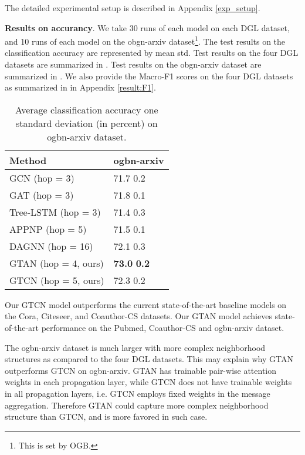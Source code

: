 \documentclass[lettersize,journal]{IEEEtran}
\theoremstyle{plain}
\theoremstyle{definition}
\theoremstyle{remark}
\begin{document}
The detailed experimental setup is described in Appendix \ref{exp_setup}.

\textbf{Results on accurancy}. We take 30 runs of each model on each DGL dataset, and 10 runs of each model on the obgn-arxiv dataset\footnote{This is set by OGB.}. The test results on the classification accuracy are represented by mean  std. Test results on the four DGL datasets are summarized in . Test results on the obgn-arxiv dataset are summarized in . We also provide the Macro-F1 scores on the four DGL datasets as summarized in  in Appendix \ref{result:F1}.

\begin{table}[ht]
	\caption{Average classification accuracy  one standard deviation (in percent) on ogbn-arxiv dataset.}
	\label{tb:result_ogb}
	\begin{center}
			\begin{tabular}{ll}
				\toprule
				\textbf{Method} &\textbf{ogbn-arxiv}\\
				\midrule
				GCN (hop = 3)  &71.7  0.2 \\
				GAT (hop = 3) &71.8  0.1 \\
				Tree-LSTM (hop = 3) &71.4  0.3 \\
				APPNP (hop = 5) &71.5  0.1 \\
				DAGNN (hop = 16) &72.1  0.3 \\
				\midrule
				GTAN (hop = 4, ours) &\textbf{73.0}  \textbf{0.2}\\
				GTCN (hop = 5, ours) &72.3  0.2\\
				\bottomrule
			\end{tabular}
	\end{center}
\end{table}

Our GTCN model outperforms the current state-of-the-art baseline models on the Cora, Citeseer, and Coauthor-CS datasets. Our GTAN model achieves state-of-the-art performance on the Pubmed, Coauthor-CS and ogbn-arxiv dataset.

The ogbn-arxiv dataset is much larger with more complex neighborhood structures as compared to the four DGL datasets. This may explain why GTAN outperforms GTCN on ogbn-arxiv. GTAN has trainable pair-wise attention weights in each propagation layer, while GTCN does not have trainable weights in all propagation layers, i.e. GTCN employs fixed weights in the message aggregation. Therefore GTAN could capture more complex neighborhood structure than GTCN, and is more favored in such case.
\end{document}
